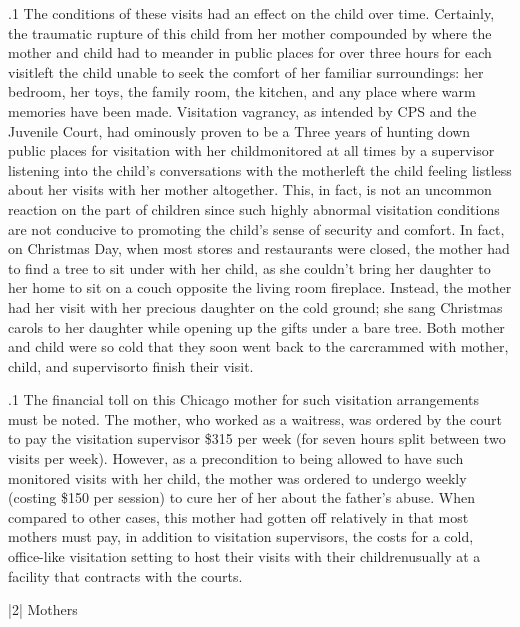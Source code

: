 \documentclass[11pt, twoside]{article}
\begin{document}
{\p.1{%
The conditions of these visits had an effect on the child over time. Certainly, the traumatic rupture of this child from her mother compounded
by \mdash{}where the mother and child had to meander
in public places for over three hours for each visit\mdash{}left the child unable to seek the comfort of her familiar surroundings: her bedroom, her
toys, the family room, the kitchen, and any place where warm memories have been made. Visitation vagrancy, as intended by CPS and the
Juvenile Court, had ominously proven to be a  Three years of
hunting down public places for visitation with her child\mdash{}monitored at
all times by a supervisor listening into the child's conversations with the
mother\mdash{}left the child feeling listless about her visits with her mother
altogether. This, in fact, is not an uncommon reaction on the part of
children since such highly abnormal visitation conditions are not conducive to promoting the child's sense of security and comfort. In fact,
on Christmas Day, when most stores and restaurants were closed, the
mother had to find a tree to sit under with her child, as she couldn't bring
her daughter to her home to sit on a couch opposite the living room fireplace. Instead, the mother had her visit with her precious daughter on
the cold ground; she sang Christmas carols to her daughter while opening up the gifts under a bare tree. Both mother and child were so cold
that they soon went back to the car\mdash{}crammed with mother, child, and
supervisor\mdash{}to finish their visit.
}%

\p.1{%
The financial toll on this Chicago mother for such visitation arrangements must be noted. The mother, who worked as a waitress, was
ordered by the court to pay the visitation supervisor \$315 per week (for
seven hours split between two visits per week). However, as a precondition to being allowed to have such monitored visits with her child, the
mother was ordered to undergo weekly  (costing \$150 per session) to cure her of her  about the father's abuse. When
compared to other cases, this mother had gotten off relatively  in
that most mothers must pay, in addition to visitation supervisors, the
costs for a cold, office-like visitation setting to host their visits with their
children\mdash{}usually at a facility that contracts with the courts.
}%


\s|2|{ Mothers}

}
\end{document}
